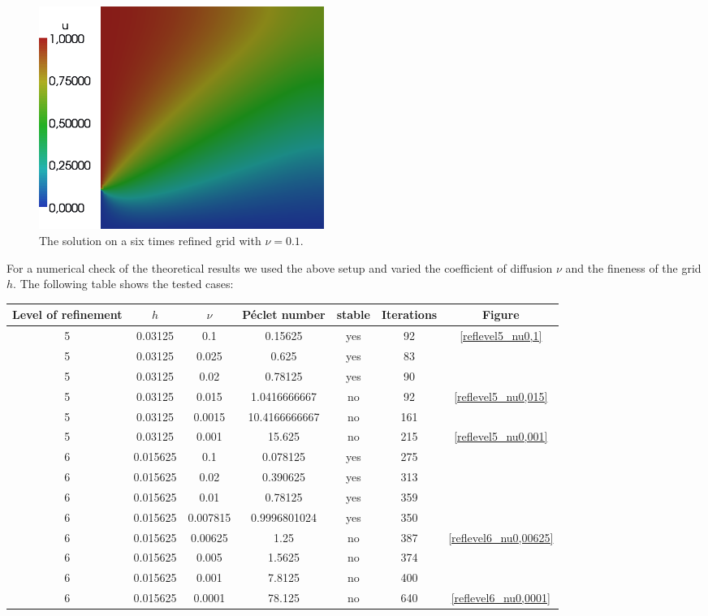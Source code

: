 \documentclass[a4paper, 11pt, twoside]{article}
\begin{document}
\begin{figure}[htbp]
\begin{center}
\includegraphics[width=0.45\textwidth]{fig/6_0,1.png}
\caption{The solution on a six times refined grid with $\nu = 0.1$.}
\label{reflevel6_nu0,1}
\end{center}
\end{figure}

For a numerical check of the theoretical results we used the above setup and varied the coefficient of diffusion $\nu$ and the fineness of the grid $h$. The following table shows the tested cases:
\newline
\begin{center}
\begin{tabular}{c|c|c|c|c|c|c}
\textbf{Level of refinement} & $h$ & $\nu$ & \textbf{P\'{e}clet number} & \textbf{stable}  & \textbf{Iterations} & \textbf{Figure} \\ \hline\hline
5 & 0.03125 & 0.1 & 0.15625 & yes  & 92 & \ref{reflevel5_nu0,1} \\
5 & 0.03125 & 0.025 & 0.625 & yes & 83 \\
5 & 0.03125 & 0.02 & 0.78125 & yes & 90 \\
5 & 0.03125 & 0.015 & 1.0416666667 & no & 92 & \ref{reflevel5_nu0,015} \\
5 & 0.03125 & 0.0015 & 10.4166666667 & no & 161 \\
5 & 0.03125 & 0.001 & 15.625 & no &  215 & \ref{reflevel5_nu0,001} \\ \hline
6 & 0.015625 & 0.1 & 0.078125 & yes & 275 \\
6 & 0.015625 & 0.02 & 0.390625 & yes & 313 \\
6 & 0.015625 & 0.01 & 0.78125 & yes & 359 \\
6 & 0.015625 & 0.007815 & 0.9996801024 & yes & 350 \\
6 & 0.015625 & 0.00625 & 1.25 & no & 387 & \ref{reflevel6_nu0,00625} \\
6 & 0.015625 & 0.005 & 1.5625 & no & 374 \\
6 & 0.015625 & 0.001 & 7.8125 & no & 400 \\
6 & 0.015625 & 0.0001 & 78.125 & no & 640 & \ref{reflevel6_nu0,0001}
\end{tabular}
\end{center}
\end{document}
